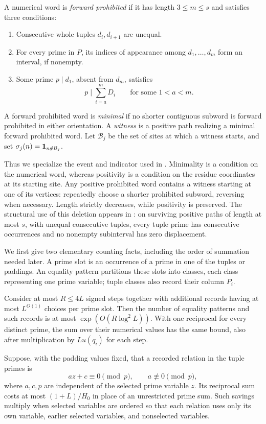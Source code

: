 \begin{definition}\label{q:prohibited}
A numerical word is \emph{forward prohibited} if it has length
$3\le m\le s$ and satisfies
three conditions:
\begin{enumerate}
\item Consecutive whole tuples $d_i,d_{i+1}$ are unequal.
\item For every prime in $P$, its indices of appearance among
$d_1,\ldots,d_m$ form an interval, if nonempty.
\item Some prime $p\mid d_1$, absent from $d_m$, satisfies
\begin{equation}\label{q:prohibited-relation}
 p\mid\sum_{i=a}^m D_i\qquad\text{for some }1<a<m.
\end{equation}
\end{enumerate}
A forward prohibited word is \emph{minimal} if no shorter contiguous
subword is forward prohibited in either orientation.  A \emph{witness}
is a positive path realizing a minimal forward prohibited word.
Let $\mathcal B_j$ be the set of sites at which a witness
starts, and set
$\sigma_j(n)=\mathbf 1_{n\notin\mathcal B_j}$.
\end{definition}

Thus we specialize the event and indicator used in
.  Minimality is a condition on the numerical word,
whereas positivity is a condition on the residue coordinates at its
starting site.  Any positive prohibited word
contains a witness starting at one of its vertices: repeatedly choose
a shorter prohibited subword, reversing when necessary.  Length
strictly decreases, while positivity is preserved.
The structural use of this deletion appears in
: on surviving positive paths of length at most
$s$, with unequal consecutive tuples, every tuple prime has consecutive
occurrences and no nonempty subinterval has zero displacement.

We first give two elementary counting facts, including the order of
summation needed later.  A prime slot is an occurrence of a prime in
one of the tuples or paddings.  An equality pattern partitions these
slots into classes, each class representing one prime variable; tuple
classes also record their column $P_i$.

\begin{lemma}\label{q:crude-count}
Consider at most $R\le4L$ signed steps together with additional
records having at most $L^{O(1)}$ choices per prime slot.  Then the number of
equality patterns and such records is at most
$\exp(O(R\log^2L))$.  With one reciprocal for every distinct prime,
the sum over their numerical values has the same bound, also after
multiplication by $Lu(q_i)$ for each step.

Suppose, with the padding values fixed, that a recorded relation in
the tuple primes is
\[
 az+c\equiv0\pmod p,\qquad a\not\equiv0\pmod p,
\]
where $a,c,p$ are independent of the selected prime variable $z$.
Its reciprocal sum costs at most $(1+L)/H_0$ in place of an
unrestricted prime sum.  Such savings multiply when selected variables
are ordered so that each relation uses only its own variable, earlier
selected variables, and nonselected variables.
\end{lemma}


